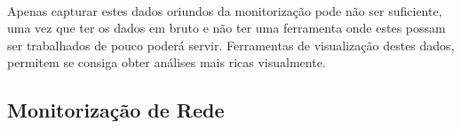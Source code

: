 \paragraph*{
}
Apenas capturar estes dados oriundos da monitorização pode não ser suficiente, uma vez que ter os dados em bruto e não ter uma ferramenta onde estes possam ser trabalhados de pouco poderá servir.
Ferramentas de visualização destes dados, permitem se consiga obter análises mais ricas visualmente.

\subsection{Monitorização de Rede}\label{sect:packet_capture}

% 
% 
% 
% 
